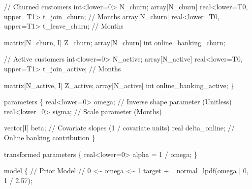 \documentclass[
  letterpaper,
  DIV=11,
  numbers=noendperiod]{scrartcl}
\newenvironment{Shaded}{\begin{snugshade}}{\end{snugshade}}
\newcommand{\CommentTok}[1]{\textcolor[rgb]{0.37,0.37,0.37}{#1}}
\newcommand{\DataTypeTok}[1]{\textcolor[rgb]{0.68,0.00,0.00}{#1}}
\newcommand{\DecValTok}[1]{\textcolor[rgb]{0.68,0.00,0.00}{#1}}
\newcommand{\FloatTok}[1]{\textcolor[rgb]{0.68,0.00,0.00}{#1}}
\newcommand{\KeywordTok}[1]{\textcolor[rgb]{0.00,0.23,0.31}{#1}}
\newcommand{\NormalTok}[1]{\textcolor[rgb]{0.00,0.23,0.31}{#1}}
\begin{document}
\begin{codelisting}
\begin{Shaded}
\begin{Highlighting}[]
  \CommentTok{// Churned customers}
  \DataTypeTok{int}\NormalTok{\textless{}}\KeywordTok{lower}\NormalTok{=}\DecValTok{0}\NormalTok{\textgreater{} N\_churn;}
  \DataTypeTok{array}\NormalTok{[N\_churn] }\DataTypeTok{real}\NormalTok{\textless{}}\KeywordTok{lower}\NormalTok{=T0, }\KeywordTok{upper}\NormalTok{=T1\textgreater{} t\_join\_churn;  }\CommentTok{// Months}
  \DataTypeTok{array}\NormalTok{[N\_churn] }\DataTypeTok{real}\NormalTok{\textless{}}\KeywordTok{lower}\NormalTok{=T0, }\KeywordTok{upper}\NormalTok{=T1\textgreater{} t\_leave\_churn; }\CommentTok{// Months}

  \DataTypeTok{matrix}\NormalTok{[N\_churn, I] Z\_churn;}
  \DataTypeTok{array}\NormalTok{[N\_churn] }\DataTypeTok{int}\NormalTok{ online\_banking\_churn;}

  \CommentTok{// Active customers}
  \DataTypeTok{int}\NormalTok{\textless{}}\KeywordTok{lower}\NormalTok{=}\DecValTok{0}\NormalTok{\textgreater{} N\_active;}
  \DataTypeTok{array}\NormalTok{[N\_active] }\DataTypeTok{real}\NormalTok{\textless{}}\KeywordTok{lower}\NormalTok{=T0, }\KeywordTok{upper}\NormalTok{=T1\textgreater{} t\_join\_active; }\CommentTok{// Months}

  \DataTypeTok{matrix}\NormalTok{[N\_active, I] Z\_active;}
  \DataTypeTok{array}\NormalTok{[N\_active] }\DataTypeTok{int}\NormalTok{ online\_banking\_active;}
\NormalTok{\}}

\KeywordTok{parameters}\NormalTok{ \{}
  \DataTypeTok{real}\NormalTok{\textless{}}\KeywordTok{lower}\NormalTok{=}\DecValTok{0}\NormalTok{\textgreater{} omega; }\CommentTok{// Inverse shape parameter (Unitless)}
  \DataTypeTok{real}\NormalTok{\textless{}}\KeywordTok{lower}\NormalTok{=}\DecValTok{0}\NormalTok{\textgreater{} sigma; }\CommentTok{// Scale parameter (Months)}

  \DataTypeTok{vector}\NormalTok{[I] beta;    }\CommentTok{// Covariate slopes (1 / covariate units)}
  \DataTypeTok{real}\NormalTok{ delta\_online; }\CommentTok{// Online banking contribution}
\NormalTok{\}}

\KeywordTok{transformed parameters}\NormalTok{ \{}
  \DataTypeTok{real}\NormalTok{\textless{}}\KeywordTok{lower}\NormalTok{=}\DecValTok{0}\NormalTok{\textgreater{} alpha = }\DecValTok{1}\NormalTok{ / omega;}
\NormalTok{\}}

\KeywordTok{model}\NormalTok{ \{}
  \CommentTok{// Prior Model}
  \CommentTok{// 0 \textless{}\textasciitilde{} omega \textless{}\textasciitilde{} 1}
  \KeywordTok{target +=}\NormalTok{ normal\_lpdf(omega | }\DecValTok{0}\NormalTok{, }\DecValTok{1}\NormalTok{ / }\FloatTok{2.57}\NormalTok{);}


\end{Highlighting}
\end{Shaded}
\end{codelisting}
\end{document}
